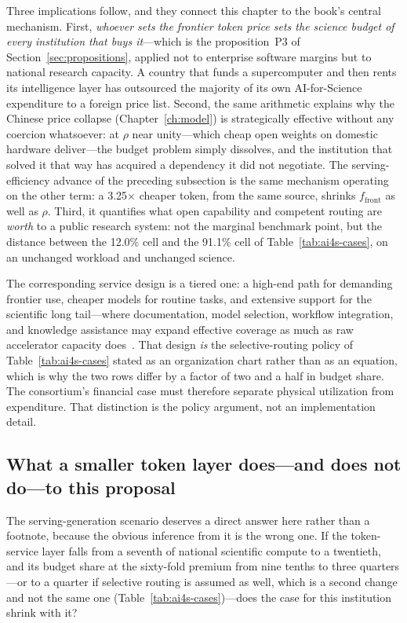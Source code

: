 Three implications follow, and they connect this chapter to the book's central mechanism. First, \emph{whoever sets the frontier token price sets the science budget of every institution that buys it}---which is the proposition~P3 of Section~\ref{sec:propositions}, applied not to enterprise software margins but to national research capacity. A country that funds a supercomputer and then rents its intelligence layer has outsourced the majority of its own AI-for-Science expenditure to a foreign price list. Second, the same arithmetic explains why the Chinese price collapse (Chapter~\ref{ch:model}) is strategically effective without any coercion whatsoever: at $\rho$ near unity---which cheap open weights on domestic hardware deliver---the budget problem simply dissolves, and the institution that solved it that way has acquired a dependency it did not negotiate. The serving-efficiency advance of the preceding subsection is the same mechanism operating on the other term: a 3.25$\times$ cheaper token, from the same source, shrinks $f_{\mathrm{front}}$ as well as $\rho$. Third, it quantifies what open capability and competent routing are \emph{worth} to a public research system: not the marginal benchmark point, but the distance between the 12.0\% cell and the 91.1\% cell of Table~\ref{tab:ai4s-cases}, on an unchanged workload and unchanged science.

The corresponding service design is a tiered one: a high-end path for demanding frontier use, cheaper models for routine tasks, and extensive support for the scientific long tail---where documentation, model selection, workflow integration, and knowledge assistance may expand effective coverage as much as raw accelerator capacity does~\cite{consortium-record}. That design \emph{is} the selective-routing policy of Table~\ref{tab:ai4s-cases} stated as an organization chart rather than as an equation, which is why the two rows differ by a factor of two and a half in budget share. The consortium's financial case must therefore separate physical utilization from expenditure. That distinction is the policy argument, not an implementation detail.

\subsection{What a smaller token layer does---and does not do---to this proposal}
\label{sec:consortium-anchor}

The serving-generation scenario deserves a direct answer here rather than a footnote, because the obvious inference from it is the wrong one. If the token-service layer falls from a seventh of national scientific compute to a twentieth, and its budget share at the sixty-fold premium from nine tenths to three quarters---or to a quarter if selective routing is assumed as well, which is a second change and not the same one (Table~\ref{tab:ai4s-cases})---does the case for this institution shrink with it?

